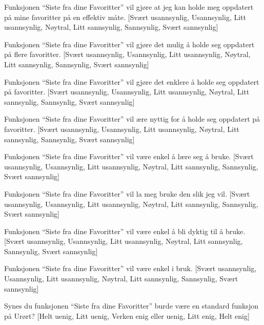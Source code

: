 \begin{enum}
  \item Funksjonen ``Siste fra dine Favoritter'' vil gjøre at jeg kan holde
    meg oppdatert på mine favoritter på en effektiv måte.
    [Svært usannsynlig, Usannsynlig, Litt usannsynlig, Nøytral,
    Litt sannsynlig,  Sannsynlig, Svært sannsynlig]
  \item Funksjonen ``Siste fra dine Favoritter'' vil gjøre det mulig å holde
    seg oppdatert på flere favoritter.
    [Svært usannsynlig, Usannsynlig, Litt usannsynlig, Nøytral,
    Litt sannsynlig,  Sannsynlig, Svært sannsynlig]
  \item Funksjonen ``Siste fra dine Favoritter'' vil gjøre det enklere å holde
    seg oppdatert på favoritter.
    [Svært usannsynlig, Usannsynlig, Litt usannsynlig, Nøytral,
    Litt sannsynlig,  Sannsynlig, Svært sannsynlig]
  \item Funksjonen ``Siste fra dine Favoritter'' vil ære nyttig for å holde
    seg oppdatert på favoritter.
    [Svært usannsynlig, Usannsynlig, Litt usannsynlig, Nøytral,
    Litt sannsynlig,  Sannsynlig, Svært sannsynlig]
  \item Funksjonen ``Siste fra dine Favoritter'' vil være enkel å lære seg å
    bruke.
    [Svært usannsynlig, Usannsynlig, Litt usannsynlig, Nøytral,
    Litt sannsynlig,  Sannsynlig, Svært sannsynlig]
  \item Funksjonen ``Siste fra dine Favoritter'' vil la meg bruke den slik jeg
    vil.
    [Svært usannsynlig, Usannsynlig, Litt usannsynlig, Nøytral,
    Litt sannsynlig,  Sannsynlig, Svært sannsynlig]
  \item Funksjonen ``Siste fra dine Favoritter'' vil være enkel å bli dyktig
    til å bruke.
    [Svært usannsynlig, Usannsynlig, Litt usannsynlig, Nøytral,
    Litt sannsynlig,  Sannsynlig, Svært sannsynlig]
  \item Funksjonen ``Siste fra dine Favoritter'' vil være enkel i bruk.
    [Svært usannsynlig, Usannsynlig, Litt usannsynlig, Nøytral,
    Litt sannsynlig,  Sannsynlig, Svært sannsynlig]
  \item Synes du funksjonen ``Siste fra dine Favoritter'' burde være en
    standard funksjon på Urørt?
    [Helt uenig, Litt uenig, Verken enig eller uenig, Litt enig, Helt enig]
\end{enum}
